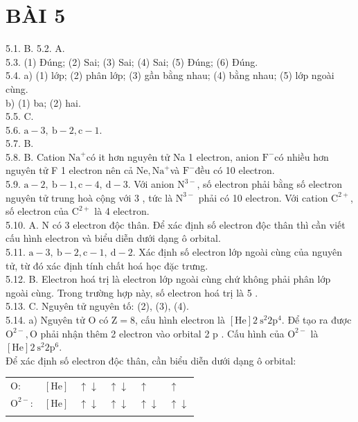\documentclass[10pt]{article}
\begin{document}
\section*{BÀI 5}
5.1. B. 5.2. A.\\
5.3. (1) Đúng; (2) Sai; (3) Sai; (4) Sai; (5) Đúng; (6) Đúng.\\
5.4. a) (1) lớp; (2) phân lớp; (3) gần bằng nhau; (4) bằng nhau; (5) lớp ngoài cùng.\\
b) (1) ba; (2) hai.\\
5.5. C.\\
5.6. $\mathrm{a}-3, \mathrm{~b}-2, \mathrm{c}-1$.\\
5.7. B.\\
5.8. B. Cation $\mathrm{Na}^{+}$có it hơn nguyên tử Na 1 electron, anion $\mathrm{F}^{-}$có nhiều hơn nguyên tử F 1 electron nên cả $\mathrm{Ne}, \mathrm{Na}^{+}$và $\mathrm{F}^{-}$đều có 10 electron.\\
5.9. $\mathrm{a}-2, \mathrm{~b}-1, \mathrm{c}-4, \mathrm{~d}-3$. Với anion $\mathrm{N}^{3-}$, số electron phải bằng số electron nguyên tử trung hoà cộng với 3 , tức là $\mathrm{N}^{3-}$ phải có 10 electron. Với cation $\mathrm{C}^{2+}$, số electron của $\mathrm{C}^{2+}$ là 4 electron.\\
5.10. A. N có 3 electron độc thân. Để xác định số electron độc thân thì cần viết cấu hình electron và biểu diễn dưới dạng ô orbital.\\
5.11. $\mathrm{a}-3, \mathrm{~b}-2, \mathrm{c}-1, \mathrm{~d}-2$. Xác định số electron lớp ngoài cùng của nguyên tử, từ đó xác định tính chất hoá học đặc trưng.\\
5.12. B. Electron hoá trị là electron lớp ngoài cùng chứ không phải phân lớp ngoài cùng. Trong trường hợp này, số electron hoá trị là 5 .\\
5.13. C. Nguyên tử nguyên tố: (2), (3), (4).\\
5.14. a) Nguyên tử O có $\mathrm{Z}=8$, cấu hình electron là $[\mathrm{He}] 2 \mathrm{~s}^{2} 2 \mathrm{p}^{4}$. Để tạo ra được $\mathrm{O}^{2-}, \mathrm{O}$ phải nhận thêm 2 electron vào orbital 2 p . Cấu hình của $\mathrm{O}^{2-}$ là $[\mathrm{He}] 2 \mathrm{~s}^{2} 2 \mathrm{p}^{6}$.\\
Để xác định số electron độc thân, cần biểu diễn dưới dạng ô orbital:

\begin{center}
\begin{tabular}{lll|l|l|l|}
O: & $[\mathrm{He}]$ & $\uparrow \downarrow$ & $\uparrow \downarrow$ & $\uparrow$ & $\uparrow$ \\
$\mathrm{O}^{2-}:$ & $[\mathrm{He}]$ & $\uparrow \downarrow$ & $\uparrow \downarrow$ & $\uparrow \downarrow$ & $\uparrow \downarrow$ \\
\cline { 2 - 5 }
 &  &  &  &  &  \\
\cline { 2 - 5 }
\end{tabular}
\end{center}
\end{document}
